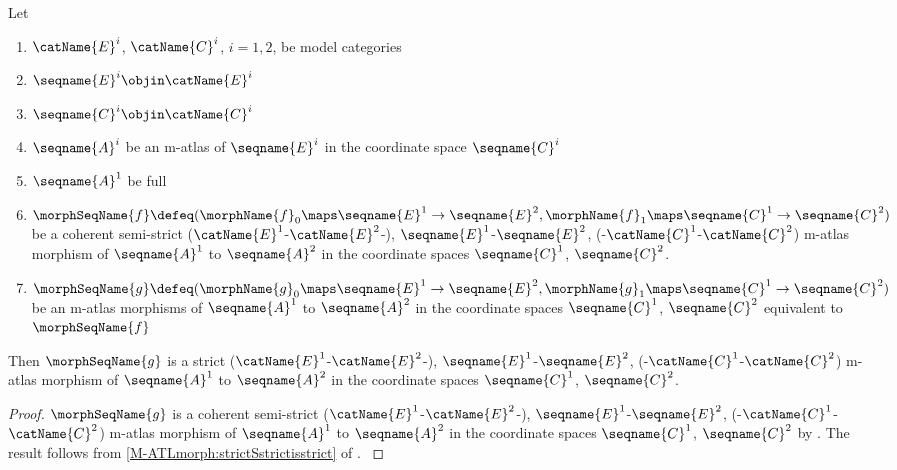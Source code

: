 \documentclass{article}
\begin{document}
\begin{corollary}
\label{cor:M-ATLmorphequiv}
Let
\begin{enumerate}
\item
$\catName{E}^i$, $\catName{C}^i$, $i=1,2$, be model categories
\item
$\seqname{E}^i \objin \catName{E}^i$
\item
$\seqname{C}^i \objin \catName{C}^i$
\item
$\seqname{A}^i$ be an m-atlas of $\seqname{E}^i$ in the coordinate space
$\seqname{C}^i$
\item
$\seqname{A}^1$ be full
\item
$
  \morphSeqName{f} \defeq
  (
    \morphName{f}_0 \maps \seqname{E}^1 \to \seqname{E}^2,
    \morphName{f}_1 \maps \seqname{C}^1 \to \seqname{C}^2
  )
$
be a coherent semi-strict
\nobreaks
  {
    {($\catName{E}^1$-$\catName{E}^2$-)},
    {$\seqname{E}^1$-$\seqname{E}^2$},
    {(-$\catName{C}^1$-$\catName{C}^2$)}
  }
m-atlas morphism of $\seqname{A}^1$ to $\seqname{A}^2$ in the
coordinate spaces $\seqname{C}^1$, $\seqname{C}^2$.
\item
$
  \morphSeqName{g} \defeq
  (
    \morphName{g}_0 \maps \seqname{E}^1 \to \seqname{E}^2,
    \morphName{g}_1 \maps \seqname{C}^1 \to \seqname{C}^2
  )
$
be an m-atlas morphisms of $\seqname{A}^1$ to $\seqname{A}^2$ in
the coordinate spaces $\seqname{C}^1$, $\seqname{C}^2$ equivalent to
$\morphSeqName{f}$
\end{enumerate}

Then $\morphSeqName{g}$ is a strict
\nobreaks
  {
    {($\catName{E}^1$-$\catName{E}^2$-)},
    {$\seqname{E}^1$-$\seqname{E}^2$},
    {(-$\catName{C}^1$-$\catName{C}^2$)}
  }
m-atlas morphism of $\seqname{A}^1$ to $\seqname{A}^2$ in the
coordinate spaces $\seqname{C}^1$, $\seqname{C}^2$.

\begin{proof}
$\morphSeqName{g}$ is a coherent semi-strict
\nobreaks
  {
    {($\catName{E}^1$-$\catName{E}^2$-)},
    {$\seqname{E}^1$-$\seqname{E}^2$},
    {(-$\catName{C}^1$-$\catName{C}^2$)}
  }
m-atlas morphism of $\seqname{A}^1$ to $\seqname{A}^2$ in the
coordinate spaces $\seqname{C}^1$, $\seqname{C}^2$ by
.
The result follows from \cref{M-ATLmorph:strictSstrictisstrict} of
{
  \showlabelsinline
  .
}
\end{proof}
\end{corollary}
\end{document}
